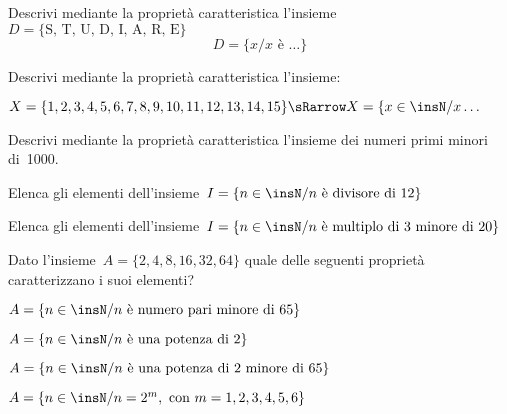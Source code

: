 
\begin{esercizio}
\label{ese:6.6}
Descrivi mediante la proprietà caratteristica
l'insieme~$D= \{\text{S, T, U, D, I, A, R, E}\}$
\[D=\{x/ x\text{ è }\ldots\}\]
\end{esercizio}


\begin{esercizio}
\label{ese:6.7}
Descrivi mediante la proprietà caratteristica l'insieme:

\(X=\{1, 2, 3, 4, 5, 6, 7, 8, 9, 10, 11, 12, 13, 14, 15\} \sRarrow
X=\{x\in\insN/x\ldots\)
\end{esercizio}

\begin{esercizio}
\label{ese:6.8}
Descrivi mediante la proprietà caratteristica l'insieme dei numeri primi minori 
di~1000.
\end{esercizio}

\begin{esercizio}
\label{ese:6.9}
Elenca gli elementi dell'insieme~$I=\{n\in\insN/n\text{ è divisore di }12\}$
\end{esercizio}

\begin{esercizio}
\label{ese:6.10}
Elenca gli elementi dell'insieme~$I=\{n\in\insN/n\text{ è multiplo di~3 minore 
di }20\}$
\end{esercizio}

\begin{esercizio}
\label{ese:6.11}
Dato l'insieme~$A=\{2, 4, 8, 16, 32, 64\}$ quale delle seguenti proprietà 
caratterizzano i suoi elementi?
\begin{enumeratea}
\item $A=\{n\in\insN/n \text{ è numero pari minore di }65\}$
\item $A=\{n\in\insN/n\text{ è una potenza di }2\}$
\item $A=\{n\in\insN/n\text{ è una potenza di~2 minore di }65\}$
\item $A=\{n\in\insN/n=2^{m},\text{ con }m=1,2,3,4,5,6\}$
\end{enumeratea}
\end{esercizio}

